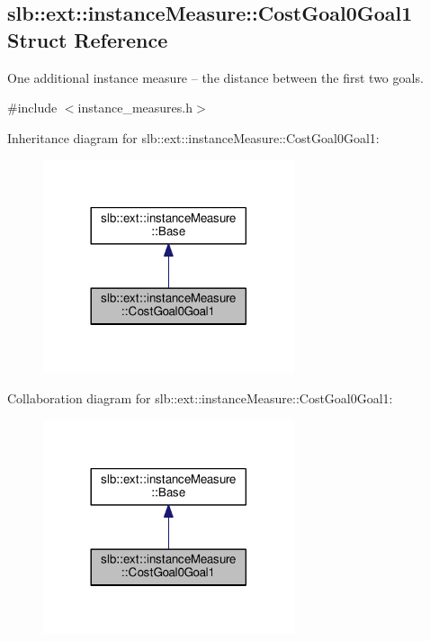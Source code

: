 \hypertarget{structslb_1_1ext_1_1instanceMeasure_1_1CostGoal0Goal1}{}\subsection{slb\+:\+:ext\+:\+:instance\+Measure\+:\+:Cost\+Goal0\+Goal1 Struct Reference}
\label{structslb_1_1ext_1_1instanceMeasure_1_1CostGoal0Goal1}


One additional instance measure -- the distance between the first two goals.  




{\ttfamily \#include $<$instance\+\_\+measures.\+h$>$}



Inheritance diagram for slb\+:\+:ext\+:\+:instance\+Measure\+:\+:Cost\+Goal0\+Goal1\+:\nopagebreak
\begin{figure}[H]
\begin{center}
\leavevmode
\includegraphics[width=209pt]{structslb_1_1ext_1_1instanceMeasure_1_1CostGoal0Goal1__inherit__graph}
\end{center}
\end{figure}


Collaboration diagram for slb\+:\+:ext\+:\+:instance\+Measure\+:\+:Cost\+Goal0\+Goal1\+:\nopagebreak
\begin{figure}[H]
\begin{center}
\leavevmode
\includegraphics[width=209pt]{structslb_1_1ext_1_1instanceMeasure_1_1CostGoal0Goal1__coll__graph}
\end{center}
\end{figure}
